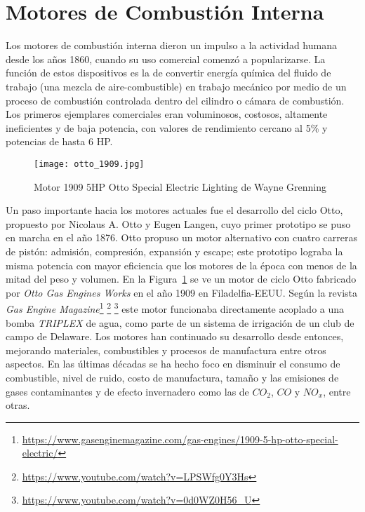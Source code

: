 \section{Motores de Combustión Interna}

Los motores de combustión interna dieron un impulso a la actividad humana desde
los años 1860, cuando su uso comercial comenzó a popularizarse.
%
La función de estos dispositivos es la de convertir energía química del fluido
de trabajo (una mezcla de aire-combustible) en trabajo mecánico por medio de un
proceso de combustión controlada dentro del cilindro o cámara de combustión.
%
Los primeros ejemplares comerciales eran voluminosos, costosos, altamente
ineficientes y de baja potencia, con valores de rendimiento cercano al 5\% y
potencias de hasta 6 HP.

\begin{figure}[h!]
  \centering
  \texttt{[image: otto\_1909.jpg]}
  \caption{Motor 1909 5HP Otto Special Electric Lighting de Wayne Grenning}\label{fig:otto1909}
\end{figure}


Un paso importante hacia los motores actuales fue el desarrollo del ciclo Otto,
propuesto por Nicolaus A. Otto y Eugen Langen, cuyo primer prototipo se puso en
marcha en el año 1876.
%
Otto propuso un motor alternativo con cuatro carreras de pistón: admisión,
compresión, expansión y escape; este prototipo lograba la misma potencia con
mayor eficiencia que los motores de la época con menos de la mitad del peso y
volumen.
%
En la Figura~\ref{fig:otto1909} se ve un motor de ciclo Otto fabricado por
\emph{Otto Gas Engines Works} en el año 1909 en Filadelfia-EEUU.
%
Según la revista \emph{Gas Engine
Magazine}\footnote{\url{https://www.gasenginemagazine.com/gas-engines/1909-5-hp-otto-special-electric/}}
\footnote{ \url{https://www.youtube.com/watch?v=LPSWfg0Y3Hs} } \footnote{
\url{https://www.youtube.com/watch?v=0d0WZ0H56_U} } este motor funcionaba
directamente acoplado a una bomba \emph{TRIPLEX} de agua, como parte de un
sistema de irrigación de un club de campo de Delaware.
%
Los motores han continuado su desarrollo desde entonces, mejorando materiales,
combustibles y procesos de manufactura entre otros aspectos.
%
En las últimas décadas se ha hecho foco en disminuir el consumo de combustible,
nivel de ruido, costo de manufactura, tamaño y las emisiones de gases
contaminantes y de efecto invernadero como las de $CO_2$, $CO$ y $NO_x$, entre
otras.


